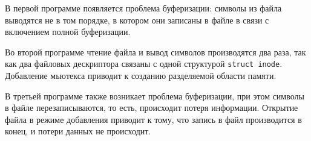 В первой программе появляется проблема буферизации: символы из файла выводятся не в том порядке, в котором они записаны в файле в связи с включением полной буферизации.

Во второй программе чтение файла и вывод символов производятся два раза, так как два файловых дескриптора связаны с одной структурой \texttt{struct inode}. Добавление мьютекса приводит к созданию разделяемой области памяти.

В третьей программе также возникает проблема буферизации, при этом символы в файле перезаписываются, то есть, происходит потеря информации. Открытие файла в режиме добавления приводит к тому, что запись в файл производится в конец, и потери данных не происходит.

